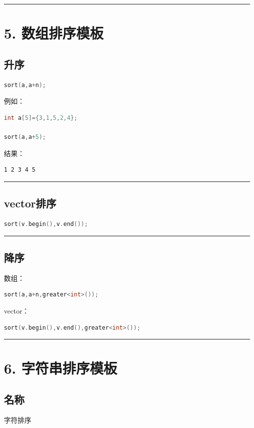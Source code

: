 \documentclass[10pt,twocolumn]{extarticle}
\begin{document}
\noindent\rule{\linewidth}{0.4pt}

\section{5. 数组排序模板}

\subsection{升序}
\begin{lstlisting}[language=C++]
sort(a,a+n);
\end{lstlisting}
例如：
\begin{lstlisting}[language=C++]
int a[5]={3,1,5,2,4};

sort(a,a+5);
\end{lstlisting}
结果：
\begin{lstlisting}
1 2 3 4 5
\end{lstlisting}

\noindent\rule{\linewidth}{0.4pt}

\subsection{vector排序}
\begin{lstlisting}[language=C++]
sort(v.begin(),v.end());
\end{lstlisting}

\noindent\rule{\linewidth}{0.4pt}

\subsection{降序}
数组：
\begin{lstlisting}[language=C++]
sort(a,a+n,greater<int>());
\end{lstlisting}
vector：
\begin{lstlisting}[language=C++]
sort(v.begin(),v.end(),greater<int>());
\end{lstlisting}

\noindent\rule{\linewidth}{0.4pt}

\section{6. 字符串排序模板}

\subsection{名称}
字符排序
\end{document}
